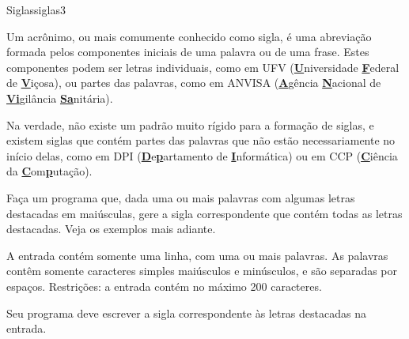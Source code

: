 \documentclass[12pt,a4paper,oneside]{article}
\begin{document}
\begin{problem}{Siglas}{siglas}{3}

Um acrônimo, ou mais comumente conhecido como sigla, é uma abreviação formada pelos componentes iniciais de uma palavra ou de uma frase. Estes componentes podem ser letras individuais, como em UFV (\underline{\textbf{U}}niversidade \underline{\textbf{F}}ederal de \underline{\textbf{V}}içosa), ou partes das palavras, como em ANVISA (\underline{\textbf{A}}gência \underline{\textbf{N}}acional de \underline{\textbf{Vi}}gilância \underline{\textbf{Sa}}nitária).

Na verdade, não existe um padrão muito rígido para a formação de siglas, e existem siglas que contém partes das palavras que não estão necessariamente no início delas, como em DPI (\underline{\textbf{D}}e\underline{\textbf{p}}artamento de \underline{\textbf{I}}nformática) ou em CCP (\underline{\textbf{C}}iência da \underline{\textbf{C}}om\underline{\textbf{p}}utação).

Faça um programa que, dada uma ou mais palavras com algumas letras destacadas em maiúsculas, gere a sigla correspondente que contém todas as letras destacadas. Veja os exemplos mais adiante.
%

\InputFile

A entrada contém somente uma linha, com uma ou mais palavras. As palavras contêm somente caracteres simples maiúsculos e minúsculos, e são separadas por espaços. Restrições: a entrada contém no máximo 200 caracteres.


\OutputFile

Seu programa deve escrever a sigla correspondente às letras destacadas na entrada.


\Example

\begin{example}
%
\end{example}

\begin{example}
%
\end{example}

\begin{example}
%
\end{example}


\begin{example}
%
\end{example}

\begin{example}
%
\end{example}


\end{problem}
\end{document}
